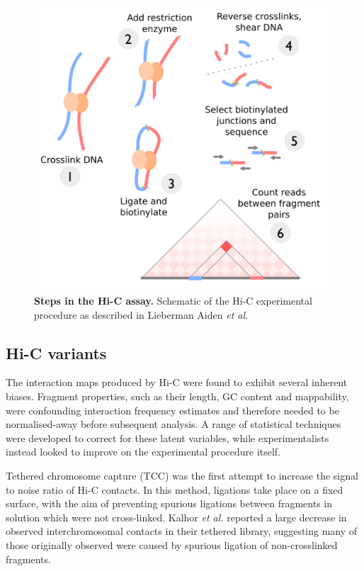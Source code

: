 \documentclass[a4paper,10pt,oneside]{book}
\begin{document}
\begin{figure}
\begin{center}
\includegraphics[width=\textwidth]{figs/hic.png}
\captionsetup{width=\textwidth}
\caption{ {\bf Steps in the Hi-C assay. } 
  Schematic of the Hi-C experimental procedure as described in Lieberman Aiden \emph{et al.}\cite{Lieberman2009}
}\label{fig:hicmethod}
\end{center}
\end{figure} 

\subsection{Hi-C variants}

The interaction maps produced by Hi-C were found to exhibit several inherent biases. Fragment properties, such as their length, GC content and mappability, were confounding interaction frequency estimates and therefore needed to be normalised-away before subsequent analysis.\cite{Yaffe2011, Hu2013} A range of statistical techniques were developed to correct for these latent variables,\cite{Imakaev2012, Dekker2013, Hu2012, Li2014} while experimentalists instead looked to improve on the experimental procedure itself.

Tethered chromosome capture (TCC)\cite{Kalhor2012} was the first attempt to increase the signal to noise ratio of Hi-C contacts. In this method, ligations take place on a fixed surface, with the aim of preventing spurious ligations between fragments in solution which were not cross-linked. Kalhor \emph{et al.}\cite{Kalhor2012} reported a large decrease in observed interchromosomal contacts in their tethered library, suggesting many of those originally observed were caused by spurious ligation of non-crosslinked fragments.
\end{document}
